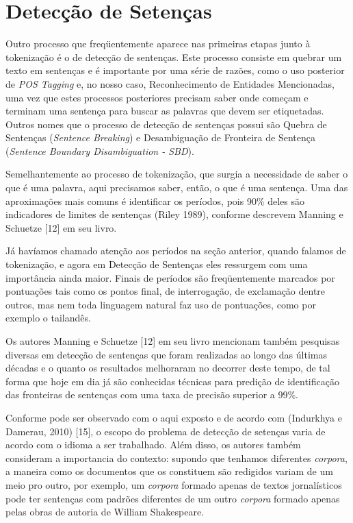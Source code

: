 \documentclass[11pt]{report}
\begin{document}
\section{Detecção de Setenças}

\indent\indent Outro processo que freqüentemente aparece nas primeiras etapas junto à tokenização é o de detecção de sentenças. Este processo consiste em
quebrar um texto em sentenças e é importante por uma série de razões, como o uso posterior de \textit{POS Tagging} e, no nosso caso, Reconhecimento de Entidades Mencionadas, uma
vez que estes processos posteriores precisam saber onde começam e terminam uma sentença para buscar as palavras que devem ser etiquetadas. Outros nomes que o processo de
detecção de sentenças possui são Quebra de Sentenças (\textit{Sentence Breaking}) e Desambiguação de Fronteira de Sentença (\textit{Sentence Boundary Disambiguation - SBD}).

Semelhantemente ao processo de tokenização, que surgia a necessidade de saber o que é uma palavra, aqui precisamos saber, então, o que é uma sentença. Uma das aproximações
mais comuns é identificar os períodos, pois 90\% deles são indicadores de limites de sentenças (Riley 1989), conforme descrevem Manning e Schuetze [12] em seu livro.

Já havíamos chamado atenção aos períodos na seção anterior, quando falamos de tokenização, e agora em Detecção de Sentenças eles ressurgem com uma importância ainda maior. Finais de
períodos são freqüentemente marcados por pontuações tais como os pontos final, de interrogação, de exclamação dentre outros, mas nem toda linguagem natural faz uso
de pontuações, como por exemplo o tailandês.

Os autores Manning e Schuetze [12] em seu livro mencionam também pesquisas diversas em detecção de sentenças que foram realizadas ao longo das últimas décadas e o quanto
os resultados melhoraram no decorrer deste tempo, de tal forma que hoje em dia já são conhecidas técnicas para predição de identificação das fronteiras de sentenças com uma
taxa de precisão superior a 99\%.

Conforme pode ser observado com o aqui exposto e de acordo com (Indurkhya e Damerau, 2010) [15], o escopo do problema de detecção de setenças varia de acordo com o idioma
a ser trabalhado. Além disso, os autores também consideram a importancia do contexto: supondo que tenhamos diferentes \textit{corpora}, a maneira como os documentos que os
constituem são redigidos variam de um meio pro outro, por exemplo, um \textit{corpora} formado apenas de textos jornalísticos pode ter sentenças com padrões diferentes de um outro
\textit{corpora} formado apenas pelas obras de autoria de William Shakespeare.
\end{document}
